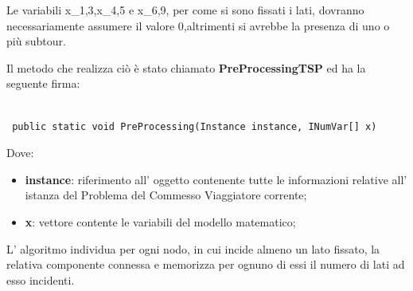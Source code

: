 \documentclass[11pt]{article}
\begin{document}
Le variabili x_{1,3},x_{4,5} e x_{6,9}, per come si sono fissati i lati, dovranno necessariamente assumere il valore 0,altrimenti si avrebbe la presenza di uno o più subtour. 

Il metodo che realizza ciò è stato chiamato \textbf{PreProcessingTSP} ed ha la seguente firma:

\begin{lstlisting}

 public static void PreProcessing(Instance instance, INumVar[] x)

\end{lstlisting}

Dove:

\begin{itemize}
    \item \textbf{instance}: riferimento all' oggetto contenente tutte le informazioni relative all' istanza del Problema del Commesso Viaggiatore corrente;
    \item \textbf{x}: vettore contente le variabili del modello matematico;
\end{itemize}

L' algoritmo individua per ogni nodo, in cui incide almeno un lato fissato, la relativa componente connessa e memorizza per ognuno di essi il numero di lati ad esso incidenti. 
\end{document}
